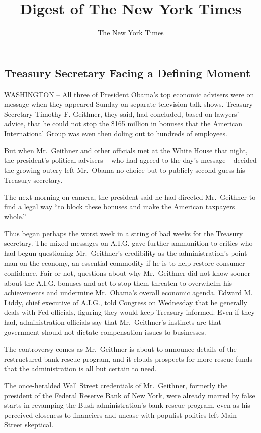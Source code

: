 \documentclass[12pt,a4paper,onecolumn]{article}
\title{Digest of The New York Times}
\author{The New York Times}
\begin{document}
\begin{CJK*}{GBK}{song}
\date{}
\tableofcontents
\pagebreak
\section{Treasury Secretary Facing a Defining Moment}

WASHINGTON -- All three of President Obama's top economic advisers were on message when they
appeared Sunday on separate television talk shows. Treasury Secretary Timothy F. Geithner, they
said, had concluded, based on lawyers' advice, that he could not stop the \$165 million in bonuses
that the American International Group was even then doling out to hundreds of employees.

But when Mr.~Geithner and other officials met at the White House that night, the president's
political advisers -- who had agreed to the day's message -- decided the growing outcry left
Mr.~Obama no choice but to publicly second-guess his Treasury secretary.

The next morning on camera, the president said he had directed Mr.~Geithner to find a legal way ``to
block these bonuses and make the American taxpayers whole.''

Thus began perhaps the worst week in a string of bad weeks for the Treasury secretary. The mixed
messages on A.I.G. gave further ammunition to critics who had begun questioning Mr.~Geithner's
credibility as the administration's point man on the economy, an essential commodity if he is to
help restore consumer confidence. Fair or not, questions about why Mr.~Geithner did not know sooner
about the A.I.G. bonuses and act to stop them threaten to overwhelm his achievements and undermine
Mr.~Obama's overall economic agenda. Edward M. Liddy, chief executive of A.I.G., told Congress on
Wednesday that he generally deals with Fed officials, figuring they would keep Treasury informed.
Even if they had, administration officials say that Mr.~Geithner's instincts are that government
should not dictate compensation issues to businesses.

The controversy comes as Mr.~Geithner is about to announce details of the restructured bank rescue
program, and it clouds prospects for more rescue funds that the administration is all but certain to
need.

The once-heralded Wall Street credentials of Mr.~Geithner, formerly the president of the Federal
Reserve Bank of New York, were already marred by false starts in revamping the Bush administration's
bank rescue program, even as his perceived closeness to financiers and unease with populist politics
left Main Street skeptical.


\end{CJK*}
\end{document}
